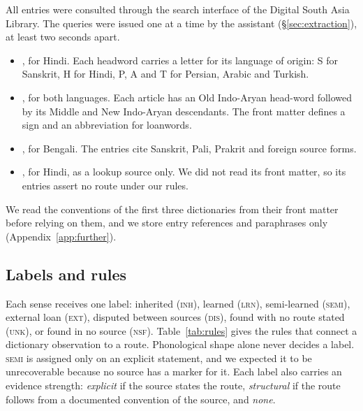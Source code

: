 \documentclass[11pt]{article}
\newcommand{\lbl}[1]{\textsc{#1}}
\begin{document}
All entries were consulted through the search interface of the Digital South Asia Library. The queries were issued one at a time by the assistant (\S\ref{sec:extraction}), at least two seconds apart.
\begin{itemize}
\item \textbf{\citet{platts1884}}, for Hindi. Each headword carries a letter for its language of origin: S for Sanskrit, H for Hindi, P, A and T for Persian, Arabic and Turkish.
\item \textbf{\citet{turner1966cdial}}, for both languages. Each article has an Old Indo-Aryan head-word followed by its Middle and New Indo-Aryan descendants. The front matter defines a sign and an abbreviation for loanwords.
\item \textbf{\citet{dasa1937bangala}}, for Bengali. The entries cite Sanskrit, Pali, Prakrit and foreign source forms.
\item \textbf{\citet{dasa1975sabdasagara}}, for Hindi, as a lookup source only. We did not read its front matter, so its entries assert no route under our rules.
\end{itemize}
We read the conventions of the first three dictionaries from their front matter before relying on them, and we store entry references and paraphrases only (Appendix~\ref{app:further}).

\subsection{Labels and rules}

Each sense receives one label: inherited (\lbl{inh}), learned (\lbl{lrn}), semi-learned (\lbl{semi}), external loan (\lbl{ext}), disputed between sources (\lbl{dis}), found with no route stated (\lbl{unk}), or found in no source (\lbl{nsf}). Table~\ref{tab:rules} gives the rules that connect a dictionary observation to a route. Phonological shape alone never decides a label. \lbl{semi} is assigned only on an explicit statement, and we expected it to be unrecoverable because no source has a marker for it. Each label also carries an evidence strength: \textit{explicit} if the source states the route, \textit{structural} if the route follows from a documented convention of the source, and \textit{none}.
\end{document}
